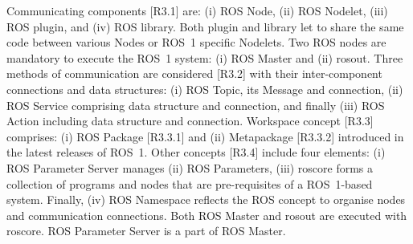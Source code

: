 \documentclass{ieeeaccess}
\begin{document}
	Communicating components [R3.1] are: (i) ROS Node, (ii) ROS Nodelet, (iii) ROS plugin, and (iv) ROS library. Both plugin and library let to share the same code between various Nodes or ROS~1 specific Nodelets. Two ROS nodes are mandatory to execute the ROS~1 system: (i) ROS Master and (ii) rosout.
	 Three methods of communication are considered [R3.2] with their inter-component connections and data structures: (i) ROS Topic, its Message and connection, (ii) ROS Service comprising data structure and connection, and finally (iii) ROS Action including data structure and connection.
	Workspace concept [R3.3] comprises: (i) ROS Package [R3.3.1] and (ii) Metapackage [R3.3.2] introduced in the latest releases of ROS~1.
	Other concepts [R3.4] include four elements: (i) ROS Parameter Server manages (ii) ROS Parameters, (iii) roscore forms a collection of programs and nodes that are pre-requisites of a ROS~1-based system. Finally, (iv) ROS Namespace reflects the ROS concept to organise nodes and communication connections. Both ROS Master and rosout are executed with roscore. ROS Parameter Server is a part of ROS Master.
\end{document}
